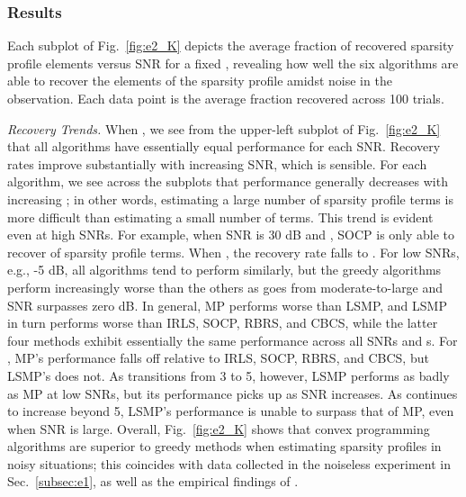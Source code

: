 \documentclass[final]{siamltex}
\begin{document}
   \subsubsection{Results}\label{subsubsec:e2_res} Each subplot of
   Fig.~\ref{fig:e2_K} depicts the average fraction of recovered
   sparsity profile elements versus SNR for a fixed , revealing how
   well the six algorithms are able to recover the  elements of the
   sparsity profile amidst noise in the observation.  Each data point
   is the average fraction recovered across 100 trials.

   {\em{Recovery Trends}.} When , we see from the upper-left
   subplot of Fig.~\ref{fig:e2_K} that all algorithms have essentially
   equal performance for each SNR\@.  Recovery rates improve
   substantially with increasing SNR, which is sensible.  For each
   algorithm, we see across the subplots that performance generally
   decreases with increasing ; in other words, estimating a large
   number of sparsity profile terms is more difficult than estimating
   a small number of terms.  This trend is evident even at high SNRs.
   For example, when SNR is 30 dB and , SOCP is only able to
   recover  of sparsity profile terms.  When , the
   recovery rate falls to .  For low SNRs, e.g., -5 dB, all
   algorithms tend to perform similarly, but the greedy algorithms
   perform increasingly worse than the others as  goes from
   moderate-to-large and SNR surpasses zero dB\@.  In general, MP
   performs worse than LSMP, and LSMP in turn performs worse than
   IRLS, SOCP, RBRS, and CBCS, while the latter four methods exhibit
   essentially the same performance across all SNRs and s.  For
   , MP's performance falls off relative to IRLS, SOCP, RBRS,
   and CBCS, but LSMP's does not.  As  transitions from 3 to 5,
   however, LSMP performs as badly as MP at low SNRs, but its
   performance picks up as SNR increases.  As  continues to
   increase beyond 5, LSMP's performance is unable to surpass that of
   MP, even when SNR is large.  Overall, Fig.~\ref{fig:e2_K} shows
   that convex programming algorithms are superior to greedy methods
   when estimating sparsity profiles in noisy situations; this
   coincides with data collected in the noiseless experiment in
   Sec.~\ref{subsec:e1}, as well as the empirical findings of
   \cite{Cot1999, Cot2005}.
\end{document}
